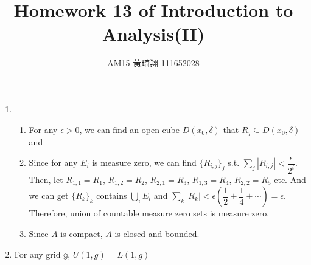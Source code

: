 \documentclass[12pt]{article}
\title{Homework 13 of Introduction to Analysis(II)}
\author{AM15 黃琦翔 111652028}
\begin{document}
\maketitle
\begin{enumerate}
    \item \begin{enumerate}
        \item For any $\epsilon > 0$, 
        we can find an open cube $D(x_0, \delta)$ that $R_j \subseteq D(x_0, \delta)$ and 

        \item Since for any $E_i$ is measure zero, we can find $\{ R_{i, j}\}_j$ s.t. 
        $\displaystyle\sum_{j} |R_{i, j}| < \dfrac{\epsilon}{2^{i}}$.
        Then, let $R_{1, 1} = R_1$, $R_{1,2} = R_2$, $R_{2, 1} = R_3$, $R_{1, 3} = R_4$, $R_{2, 2} = R_5$ etc.
        And we can get $\{ R_k\}_k$ contains $\displaystyle\bigcup_i E_i$ and $\displaystyle\sum_{k} |R_k| < \epsilon(\dfrac{1}{2} + \dfrac{1}{4} + \cdots) = \epsilon$.
        Therefore, union of countable measure zero sets is measure zero.

        \item Since $A$ is compact, $A$ is closed and bounded.
    \end{enumerate}

    \item For any grid $\mathbb{g}$, $U(1, g) = L(1, g)$
\end{enumerate}
\end{document}
